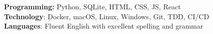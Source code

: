 \textbf{Programming:} Python, SQLite, HTML, CSS, JS, React\\
\textbf{Technology}: Docker, macOS, Linux, Windows, Git, TDD, CI/CD \\
\textbf{Languages}: Fluent English with excellent spelling and grammar
